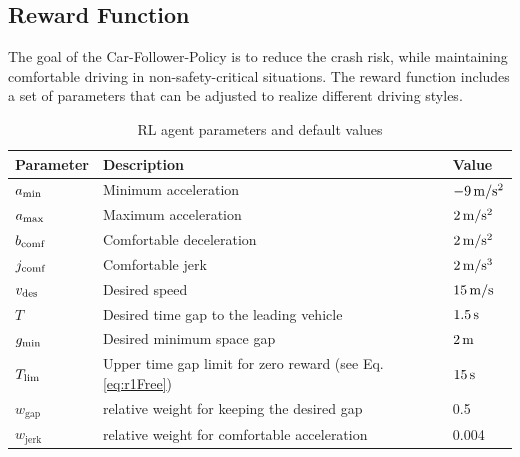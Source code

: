 \documentclass[review]{elsarticle}
\providecommand{\martinc}[1]{}                  %
\providecommand{\sub}[1]{_{\mathrm{#1}}}  %
\providecommand{\3}{{\ss}}
\begin{document}
\subsection{Reward Function}
\label{rewardFunctionFollow}
\martinc{Die reward function ist nicht als Funktion des skalierten
  Statevektors S $s_t$, sondern mit Hilfe der unskalierten Statevariablen
  formuliert (obwohl die meisten Terme der Rewardfunktion ihre eigene
  Skalierung enthalten, nicht aber $r_1$). Stimmt das? Falls nicht, h\"atte man das Problem, dass
  in Extremf\"allen (Tempo 130 oder 150 auf stehendes Hindernis)
  $g\sub{max}=\unit[200]{m}$ nicht ausreicht. Ignoriert die reward
  function die skalierten States (warum braucht man die dann aber?),
  gibt es hingegen kein Problem.}
The goal of the Car-Follower-Policy is to reduce the crash risk, while
maintaining comfortable driving in non-safety-critical situations. The
reward function includes a set of parameters that can be
adjusted to realize different driving styles. 

\begin{table}
	\caption{RL agent parameters and default values} 
	\label{tab:agentParameters} 
	\begin{center}
		\begin{tabular}{ p{}| p{}| p{}}
			Parameter & Description & Value \\ \hline
			$a\sub{\rm min}$ & Minimum acceleration & $\unit[-9]{m/s^2}$ \\  
			$a_{\rm max}$ & Maximum acceleration & $\unit[2]{m/s^2}$ \\  
			$b_{\rm comf}$ & Comfortable deceleration & $\unit[2]{m/s^2}$ \\  
			$j_{\rm comf}$ & Comfortable jerk & $\unit[2]{m/s^3}$ \\  
			$v_{\rm des}$ & Desired speed & $\unit[15]{ m/s}$ \\  		
			$T$ & Desired time gap to the leading vehicle & $\unit[1.5]{s}$ \\
			$g_{\rm min}$ & Desired minimum space gap & $\unit[2]{m}$ \\
			$T_{\rm lim}$ & Upper time gap limit for zero reward (see
			Eq. \eqref{eq:r1Free}) & $\unit[15]{s}$ \\
			$w\sub{gap}$ & relative weight for keeping the desired gap & 0.5\\
			$w\sub{jerk}$ & relative weight for comfortable acceleration & 0.004\\
		\end{tabular}
	\end{center}
\end{table}
\end{document}
